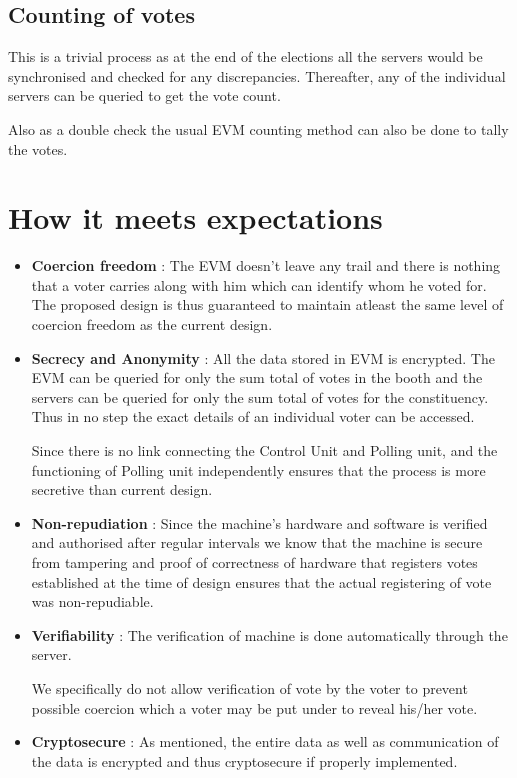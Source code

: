 \documentclass[a4paper,12pt,openany]{book}
\begin{document}
\subsection{Counting of votes}
This is a trivial process as at the end of the elections all the servers would be synchronised and checked for any discrepancies. Thereafter, any of the individual servers can be queried to get the vote count.

Also as a double check the usual EVM counting method can also be done to tally the votes.


\section{How it meets expectations}
\begin{itemize}
\item \textbf{Coercion freedom} : The EVM doesn't leave any trail and there is nothing that a voter carries along with him which can identify whom he voted for. The proposed design is thus guaranteed to maintain atleast the same level of coercion freedom as the current design.

\item \textbf{Secrecy and Anonymity} : All the data stored in EVM is encrypted. The EVM can be queried for only the sum total of votes in the booth and the servers can be queried for only the sum total of votes for the constituency. Thus in no step the exact details of an individual voter can be accessed. 

Since there is no link connecting the Control Unit and Polling unit, and  the functioning of Polling unit independently ensures that the process is more secretive than current design.

\item \textbf{Non-repudiation} :
Since the machine's hardware and software is verified and authorised after regular intervals we know that the machine is secure from tampering and proof of correctness of hardware that registers votes established at the time of design ensures that the actual registering of vote was non-repudiable.

\item \textbf{Verifiability} :
The verification of machine is done automatically through the server.

We specifically do not allow verification of vote by the voter to prevent possible coercion which a voter may be put under to reveal his/her vote.

\item \textbf{Cryptosecure} :
As mentioned, the entire data as well as communication of the data is encrypted and thus cryptosecure if properly implemented.


\end{itemize}
\end{document}

